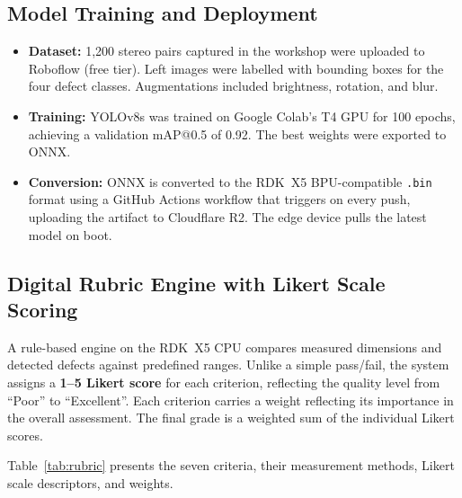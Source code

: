 \documentclass[12pt,a4paper]{article}
\begin{document}
\subsection{Model Training and Deployment}

\begin{itemize}[leftmargin=*, itemsep=3pt]
  \item \textbf{Dataset:} 1{,}200 stereo pairs captured in the workshop were uploaded to Roboflow (free tier).
        Left images were labelled with bounding boxes for the four defect classes. Augmentations included
        brightness, rotation, and blur.
  \item \textbf{Training:} YOLOv8s was trained on Google Colab's T4 GPU for 100 epochs, achieving a
        validation mAP@0.5 of 0.92. The best weights were exported to ONNX.
  \item \textbf{Conversion:} ONNX is converted to the RDK~X5 BPU-compatible \texttt{.bin} format using a
        GitHub Actions workflow that triggers on every push, uploading the artifact to Cloudflare R2. The edge
        device pulls the latest model on boot.
\end{itemize}

\subsection{Digital Rubric Engine with Likert Scale Scoring}

A rule-based engine on the RDK~X5 CPU compares measured dimensions and detected defects against predefined
ranges. Unlike a simple pass/fail, the system assigns a \textbf{1--5 Likert score} for each criterion,
reflecting the quality level from ``Poor'' to ``Excellent''. Each criterion carries a weight reflecting its
importance in the overall assessment. The final grade is a weighted sum of the individual Likert scores.

Table~\ref{tab:rubric} presents the seven criteria, their measurement methods, Likert scale descriptors, and
weights.
\end{document}
